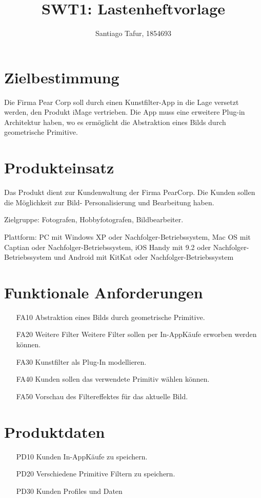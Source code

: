\documentclass[parskip=full]{scrartcl}
\title{SWT1: Lastenheftvorlage}
\author{Santiago Tafur, 1854693}
\begin{document}
\maketitle

%
%


%
%
\section{Zielbestimmung}
Die Firma Pear Corp soll durch einen Kunstfilter-App in die Lage versetzt werden, den Produkt iMage vertrieben. Die App muss eine erweitere Plug-in Architektur haben, wo es ermöglicht die Abstraktion eines Bilds durch geometrische Primitive.

\section{Produkteinsatz}
Das Produkt dient zur Kundenwaltung der Firma PearCorp. Die Kunden sollen die Möglichkeit zur Bild- Personalisierung und Bearbeitung haben.

Zielgruppe: Fotografen, Hobbyfotografen, Bildbearbeiter.

Plattform: PC mit Windows XP oder Nachfolger-Betriebssystem, Mac OS mit Captian oder Nachfolger-Betriebssystem, iOS Handy mit 9.2 oder Nachfolger-Betriebssystem und Android mit KitKat oder Nachfolger-Betriebssystem

\section{Funktionale Anforderungen}
\begin{itemize}[nosep]
\item[FA10] Abstraktion eines Bilds durch geometrische Primitive.
\item[FA20] Weitere Filter Weitere Filter sollen per In-AppKäufe erworben werden können.
\item[FA30] Kunstfilter als Plug-In modellieren.
\item[FA40] Kunden sollen das verwendete Primitiv wählen können.
\item[FA50] Vorschau des Filtereffektes für das aktuelle Bild.

\end{itemize}

\section{Produktdaten}
\begin{itemize}[nosep]
\item[PD10] Kunden In-AppKäufe zu speichern.
\item[PD20] Verschiedene Primitive Filtern zu speichern.
\item[PD30] Kunden Profiles und Daten

\end{itemize}
\end{document}
